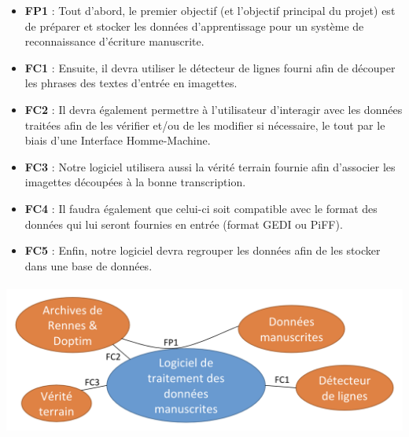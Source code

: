 \begin{itemize}
\item \textbf{FP1} : Tout d’abord, le premier objectif (et l’objectif principal du projet) est
de préparer et stocker les données d’apprentissage pour un système de reconnaissance d’écriture manuscrite.
\item \textbf{FC1} : Ensuite, il devra utiliser le détecteur de lignes fourni afin de découper
les phrases des textes d’entrée en imagettes. 
\item \textbf{FC2} : Il devra également permettre à l’utilisateur d’interagir avec les données
traitées afin de les vérifier et/ou de les modifier si nécessaire, le tout par le biais d’une Interface Homme-Machine. 
\item \textbf{FC3} : Notre logiciel utilisera aussi la vérité terrain fournie afin d’associer
les imagettes découpées à la bonne transcription.
\item \textbf{FC4} : Il faudra également que celui-ci soit compatible avec le format des données
qui lui seront fournies en entrée (format GEDI ou PiFF).
\item \textbf{FC5} : Enfin, notre logiciel devra regrouper les données afin de les stocker dans une base de données.
\end{itemize}

\paragraph{}
\begin{mdframed}
\begin{center}
\includegraphics[width=0.7\linewidth]{pieuvre.png}
\end{center}
\end{mdframed}

\newpage